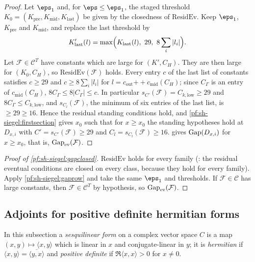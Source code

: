 \begin{proof}
Let $\eps_1$ and, for $\eps\le\eps_1$, the staged threshold $K_0=(K_{\mathrm{pre}},K_{\mathrm{mid}},K_{\mathrm{last}})$ be
given by the closedness of $\mathrm{ResidEv}$. Keep $\eps_1$, $K_{\mathrm{pre}}$ and $K_{\mathrm{mid}}$, and replace the
last threshold by
\[
K'_{\mathrm{last}}(l)=\max\Bigl(K_{\mathrm{last}}(l),\ 29,\ 8\sum_i|l_i|\Bigr).
\]
Let $\mathcal F\in\mathcal C^T$ have constants which are large for $(K',C_H)$. They are then large for $(K_0,C_H)$, so
$\mathrm{ResidEv}(\mathcal F)$ holds. Every entry $c$ of the last list of constants satisfies $c\ge29$ and
$c\ge8\sum_i|l_i|$ for $l=c_{\mathrm{out}}\mathbin{+\!\!+}c_{\mathrm{mid}}(C_H)$; since $C_\Gamma$ is an entry of
$c_{\mathrm{mid}}(C_H)$, $8C_\Gamma\le8|C_\Gamma|\le c$. In particular $s_{C'}(\mathcal F)=C_{k,\mathrm{low}}\ge29$ and
$8C_\Gamma\le C_{k,\mathrm{low}}$, and $s_{C_l}(\mathcal F)$, the minimum of six entries of the last list, is $\ge29\ge16$.
Hence the residual standing conditions hold, and \cref{pf:sh-siegel:firstsection} gives $x_0$ such that for $x\ge x_0$ the
standing hypotheses hold at $D_{x,i}$ with $C'=s_{C'}(\mathcal F)\ge29$ and $C_l=s_{C_l}(\mathcal F)\ge16$.
 gives $\mathrm{Gap}(D_{x,i})$ for $x\ge x_0$, that is, $\mathrm{Gap}_{\mathrm{ev}}(\mathcal
F)$.
\end{proof}

\begin{proof}[Proof of \cref{pf:sh-siegel:gapclosed}]
$\mathrm{ResidEv}$ holds for every family (: the residual
eventual conditions are closed on every class, because they hold for every family). Apply \cref{pf:sh-siegel:gaprow}
and take the same $\eps_1$ and thresholds. If $\mathcal F\in\mathcal C$ has large constants, then $\mathcal F\in\mathcal
C^T$ by hypothesis, so $\mathrm{Gap}_{\mathrm{ev}}(\mathcal F)$.
\end{proof}


\subsection{Adjoints for positive definite hermitian forms}\label{sec:pf:sh-siegel:adj}

In this subsection a \emph{sesquilinear form} on a complex vector space $C$ is a map $(x,y)\mapsto\langle x,y\rangle$
which is linear in $x$ and conjugate-linear in $y$; it is \emph{hermitian} if $\langle x,y\rangle=\overline{\langle
y,x\rangle}$ and \emph{positive definite} if $\Re\langle x,x\rangle>0$ for $x\ne0$.

